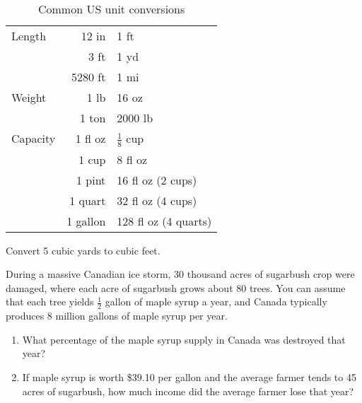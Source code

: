 \begin{table}[h]
  \centering
  \begin{tabular}{lr@{ = }l}
    \toprule
    Length & 12 in & 1 ft \\
           & 3 ft & 1 yd \\
           & 5280 ft & 1 mi \\
    \midrule
    Weight & 1 lb & 16 oz \\
           & 1 ton & 2000 lb \\
    \midrule
    Capacity & 1 fl oz & \(\tfrac{1}{8}\) cup \\
           & 1 cup & 8 fl oz \\
           & 1 pint & 16 fl oz (2 cups) \\
           & 1 quart & 32 fl oz (4 cups) \\
           & 1 gallon & 128 fl oz (4 quarts) \\
    \bottomrule
  \end{tabular}
  \caption{Common US unit conversions}%
  \label{tab:unit-conversions}
\end{table}

\begin{exercise}
  Convert 5 cubic yards to cubic feet.

\end{exercise}

\newpage

\begin{exercise}
  During a massive Canadian ice storm, 30 thousand acres of sugarbush
  crop were damaged, where each acre of sugarbush grows about 80
  trees. You can assume that each tree yields \(\tfrac{1}{2}\) gallon
  of maple syrup a year, and Canada typically produces 8 million
  gallons of maple syrup per year.

  \begin{enumerate}
  \item What percentage of the maple syrup supply in Canada was destroyed
    that year?


  \item If maple syrup is worth \$39.10 per gallon and the average
    farmer tends to 45 acres of sugarbush, how much income did the
    average farmer lose that year?


  \end{enumerate}
\end{exercise}

